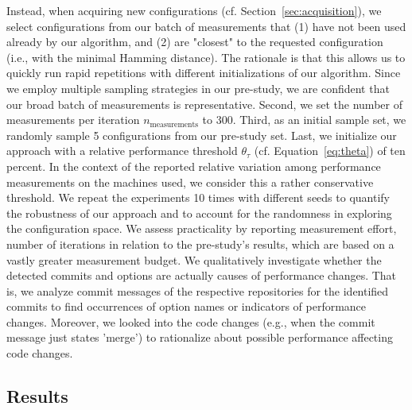 \documentclass[sigconf]{acmart}
\begin{document}
	Instead, when acquiring new configurations (cf. Section~\ref{sec:acquisition}), we select configurations from our batch of measurements that (1) have not been used already by our algorithm, and (2) are "closest" to the requested configuration (i.e., with the minimal Hamming distance). The rationale is that this allows us to quickly run rapid repetitions with different initializations of our algorithm. Since we employ multiple sampling strategies in our pre-study, we are confident that our broad batch of measurements is representative. Second, we set the number of measurements per iteration $n_\text{measurements}$ to 300. Third, as an initial sample set, we randomly sample 5 configurations from our pre-study set. 
	Last, we initialize our approach with a relative performance threshold $\theta_\tau$ (cf. Equation~\ref{eq:theta}) of ten percent. In the context of the reported relative variation among performance measurements on the machines used, we consider this a rather conservative threshold. 
	We repeat the experiments 10 times with different seeds to quantify the robustness of our approach and to account for the randomness in exploring the configuration space.
	We assess practicality by reporting measurement effort, number of iterations in relation to the pre-study's results, which are based on a vastly greater measurement budget.
	We qualitatively investigate whether the detected commits and options are actually causes of performance changes. That is, we analyze commit messages of the respective repositories for the identified commits to find occurrences of option names or indicators of performance changes. Moreover, we looked into the code changes (e.g., when the commit message just states 'merge') to rationalize about possible performance affecting code changes.
	
	\subsection{Results}	
\end{document}

